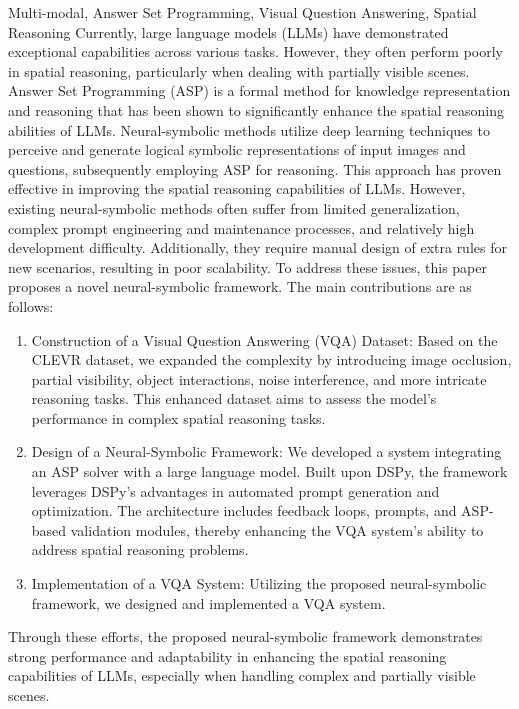 \begin{englishabstract}{Multi-modal, Answer Set Programming, Visual Question Answering, Spatial Reasoning}
    Currently, large language models (LLMs) have demonstrated exceptional capabilities across various tasks. However, they often perform poorly in spatial reasoning, particularly when dealing with partially visible scenes. Answer Set Programming (ASP) is a formal method for knowledge representation and reasoning that has been shown to significantly enhance the spatial reasoning abilities of LLMs.
Neural-symbolic methods utilize deep learning techniques to perceive and generate logical symbolic representations of input images and questions, subsequently employing ASP for reasoning. This approach has proven effective in improving the spatial reasoning capabilities of LLMs. However, existing neural-symbolic methods often suffer from limited generalization, complex prompt engineering and maintenance processes, and relatively high development difficulty. Additionally, they require manual design of extra rules for new scenarios, resulting in poor scalability.
To address these issues, this paper proposes a novel neural-symbolic framework. The main contributions are as follows:
\begin{enumerate}[itemsep=0pt]
    \item Construction of a Visual Question Answering (VQA) Dataset: Based on the CLEVR dataset, we expanded the complexity by introducing image occlusion, partial visibility, object interactions, noise interference, and more intricate reasoning tasks. This enhanced dataset aims to assess the model's performance in complex spatial reasoning tasks.
    \item Design of a Neural-Symbolic Framework: We developed a system integrating an ASP solver with a large language model. Built upon DSPy, the framework leverages DSPy's advantages in automated prompt generation and optimization. The architecture includes feedback loops, prompts, and ASP-based validation modules, thereby enhancing the VQA system's ability to address spatial reasoning problems.
    \item Implementation of a VQA System: Utilizing the proposed neural-symbolic framework, we designed and implemented a VQA system.
\end{enumerate}

Through these efforts, the proposed neural-symbolic framework demonstrates strong performance and adaptability in enhancing the spatial reasoning capabilities of LLMs, especially when handling complex and partially visible scenes.
\end{englishabstract}

\tableofcontents
\listofothers
